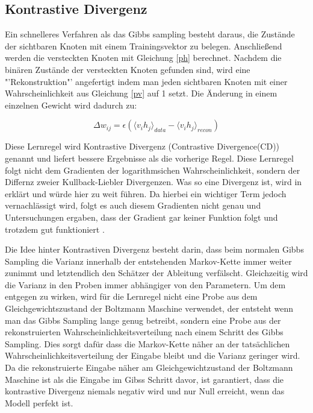 \documentclass[12pt]{article}
\begin{document}
\subsection{Kontrastive Divergenz}

Ein schnelleres Verfahren als das Gibbs sampling besteht daraus, die Zustände der sichtbaren Knoten mit einem Trainingsvektor zu belegen. Anschließend werden die versteckten Knoten mit Gleichung \ref{ph} berechnet. Nachdem die binären Zustände der versteckten Knoten gefunden sind, wird eine "'Rekonstruktion"' angefertigt indem man jeden sichtbaren Knoten mit einer Wahrscheinlichkeit aus Gleichung \ref{pv} auf 1 setzt. Die Änderung in einem einzelnen Gewicht wird dadurch zu:

\begin{equation}
\Delta w_{ij} = \epsilon \left( \langle v_i h_j\rangle_{data} - \langle v_i h_j \rangle_{recon}\right)
\end{equation}

Diese Lernregel wird Kontrastive Divergenz (Contrastive Divergence(CD)) genannt und liefert bessere Ergebnisse als die vorherige Regel. Diese Lernregel folgt nicht dem Gradienten der logarithmsichen Wahrscheinlichkeit, sondern der Differnz zweier Kullback-Liebler Divergenzen. Was so eine Divergenz ist, wird in \cite{KLD} erklärt und würde hier zu weit führen. Da hierbei ein wichtiger Term jedoch vernachlässigt wird, folgt es auch diesem Gradienten nicht genau und Untersuchungen ergaben, dass der Gradient gar keiner Funktion folgt und trotzdem gut funktioniert \cite{noconv}. 

Die Idee hinter Kontrastiven Divergenz besteht darin, dass beim normalen Gibbs Sampling die Varianz innerhalb der entstehenden Markov-Kette immer weiter zunimmt und letztendlich den Schätzer der Ableitung verfälscht. Gleichzeitig wird die Varianz in den Proben immer abhängiger von den Parametern. Um dem entgegen zu wirken, wird für die Lernregel nicht eine Probe aus dem Gleichgewichtszustand der Boltzmann Maschine verwendet, der entsteht wenn man das Gibbs Sampling lange genug betreibt, sondern eine Probe aus der rekonstruierten Wahrscheinlichkeitsverteilung nach einem Schritt des Gibbs Sampling. Dies sorgt dafür dass die Markov-Kette näher an der tatsächlichen Wahrscheinlichkeitsverteilung der Eingabe bleibt und die Varianz geringer wird. Da die rekonstruierte Eingabe näher am Gleichgewichtzustand der Boltzmann Maschine ist als die Eingabe im Gibss Schritt davor, ist garantiert, dass die kontrastive Divergenz niemals negativ wird und nur Null erreicht, wenn das Modell perfekt ist. \cite{digits}
\end{document}
